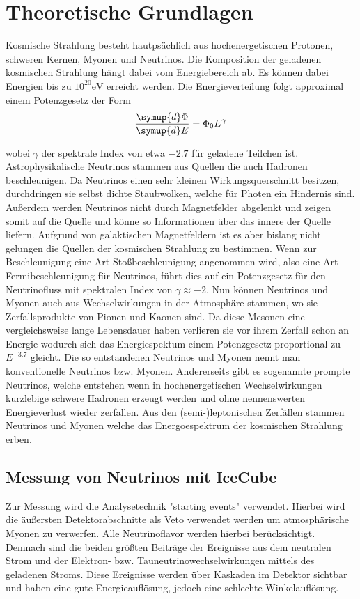 \section{Theoretische Grundlagen}
\label{sec:theorie}
Kosmische Strahlung besteht hautps\"achlich aus hochenergetischen Protonen, schweren Kernen, Myonen und Neutrinos. Die Komposition der geladenen kosmischen Strahlung h\"angt dabei vom Energiebereich ab. Es k\"onnen dabei Energien bis zu $10^{20} \si{\electronvolt}$ erreicht werden. Die Energieverteilung folgt approximal einem Potenzgesetz der Form
\begin{equation*}
  \frac{\symup{d}\Phi}{\symup{d}E} = \Phi_0 E^{\gamma}
\end{equation*}

wobei $\gamma$ der spektrale Index von etwa $-2.7$ f\"ur geladene Teilchen ist.
Astrophysikalische Neutrinos stammen aus Quellen die auch Hadronen beschleunigen. Da Neutrinos einen sehr kleinen Wirkungsquerschnitt besitzen, durchdringen sie selbst dichte Staubwolken, welche f\"ur Photen ein Hindernis sind. Au\ss erdem werden Neutrinos nicht durch Magnetfelder abgelenkt und zeigen somit auf die Quelle und k\"onne so Informationen \"uber das innere der Quelle liefern.
Aufgrund von galaktischen Magnetfeldern ist es aber bislang nicht gelungen die Quellen der kosmischen Strahlung zu bestimmen.
Wenn zur Beschleunigung eine Art Sto\ss beschleunigung angenommen wird, also eine Art Fermibeschleunigung f\"ur Neutrinos, f\"uhrt dies auf ein Potenzgesetz f\"ur den Neutrinofluss mit spektralen Index von $\gamma \approx -2$.
Nun k\"onnen Neutrinos und Myonen auch aus Wechselwirkungen in der Atmosph\"are stammen, wo sie Zerfallsprodukte von Pionen und Kaonen sind. Da diese Mesonen eine vergleichsweise lange Lebensdauer haben verlieren sie vor ihrem Zerfall schon an Energie wodurch sich das Energiespektum einem Potenzgesetz proportional zu $E^{-3.7}$ gleicht. Die so entstandenen Neutrinos und Myonen nennt man konventionelle Neutrinos bzw. Myonen.
Andererseits gibt es sogenannte prompte Neutrinos, welche entstehen wenn in hochenergetischen Wechselwirkungen kurzlebige schwere Hadronen erzeugt werden und ohne nennenswerten Energieverlust wieder zerfallen. Aus den (semi-)leptonischen Zerf\"allen stammen Neutrinos und Myonen welche das  Energoespektrum der kosmischen Strahlung erben.

\subsection{Messung von Neutrinos mit IceCube}
Zur Messung wird die Analysetechnik "starting events" verwendet. Hierbei wird die \"au\ss ersten Detektorabschnitte als Veto verwendet werden um atmosph\"arische Myonen zu verwerfen.
Alle Neutrinoflavor werden hierbei ber\"ucksichtigt. Demnach sind die beiden gr\"o\ss ten Beitr\"age der Ereignisse aus dem neutralen Strom und der Elektron- bzw. Tauneutrinowechselwirkungen mittels des geladenen Stroms. Diese Ereignisse werden \"uber Kaskaden im Detektor sichtbar und haben eine gute Energieaufl\"osung, jedoch eine schlechte Winkelaufl\"osung.

